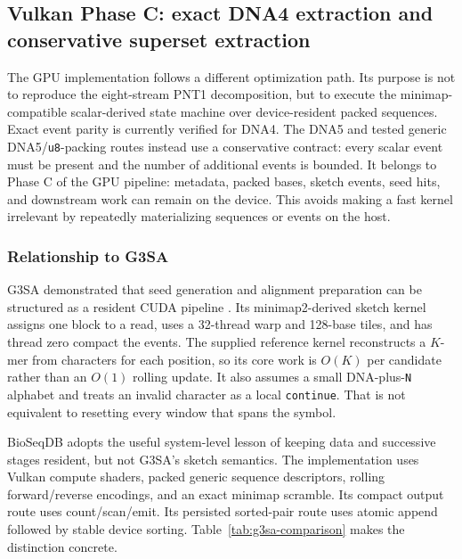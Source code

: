 \subsection{Vulkan Phase C: exact DNA4 extraction and conservative superset extraction}
\label{sec:vulkan-minimizers}

The GPU implementation follows a different optimization path.  Its purpose is
not to reproduce the eight-stream PNT1 decomposition, but to execute the
minimap-compatible scalar-derived state machine over device-resident packed
sequences. Exact event parity is currently verified for DNA4. The DNA5 and
tested generic DNA5/\texttt{u8}-packing routes instead use a conservative
contract: every scalar event must be present and the number of additional
events is bounded. It belongs to Phase C of the GPU pipeline: metadata, packed
bases, sketch events, seed hits, and downstream work can remain on the device. This
avoids making a fast kernel irrelevant by repeatedly materializing sequences
or events on the host.

\subsubsection{Relationship to G3SA}

G3SA demonstrated that seed generation and alignment preparation can be
structured as a resident CUDA pipeline \cite{g3sa_paper}. Its
minimap2-derived sketch kernel
assigns one block to a read, uses a 32-thread warp and 128-base tiles, and has
thread zero compact the events.  The supplied reference kernel reconstructs a
$K$-mer from characters for each position, so its core work is
$O(K)$ per candidate rather than an $O(1)$ rolling update.  It also assumes a
small DNA-plus-\texttt{N} alphabet and treats an invalid character as a local
\texttt{continue}. That is not equivalent to resetting every window that
spans the symbol.

BioSeqDB adopts the useful system-level lesson of keeping data and successive
stages resident, but not G3SA's sketch semantics.  The implementation uses
Vulkan compute shaders, packed generic sequence descriptors, rolling
forward/reverse encodings, and an exact minimap scramble. Its compact output
route uses count/scan/emit. Its persisted sorted-pair route uses atomic append
followed by stable device sorting. Table~\ref{tab:g3sa-comparison} makes the
distinction concrete.

